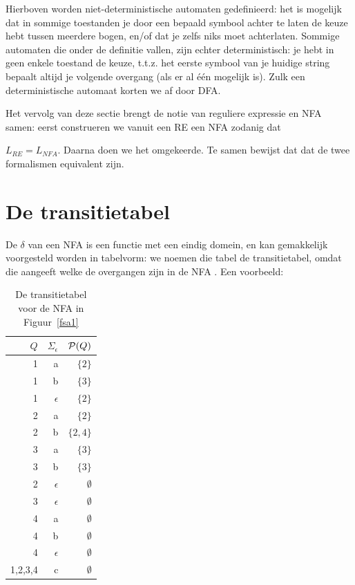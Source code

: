 Hierboven worden niet-deterministische automaten gedefinieerd: het is
mogelijk dat in sommige toestanden je door een bepaald symbool achter
te laten de keuze hebt tussen meerdere bogen, en/of dat je zelfs niks
moet achterlaten. Sommige automaten die onder de definitie vallen,
zijn echter deterministisch: je hebt in geen enkele toestand de keuze,
t.t.z. het eerste symbool van je huidige string bepaalt altijd je
volgende overgang (als er al \'{e}\'{e}n mogelijk is). Zulk een
deterministische automaat korten we af door DFA.


Het vervolg van deze sectie brengt de notie van reguliere expressie en
NFA samen: eerst construeren we vanuit een RE een NFA zodanig dat

$L_{RE} = L_{NFA}$. Daarna doen we het omgekeerde. Te samen bewijst
dat dat de twee formalismen equivalent zijn.


\section{De transitietabel}

De $\delta$ van een NFA is een functie met een eindig domein, en kan
gemakkelijk voorgesteld worden in tabelvorm: we noemen die tabel
de transitietabel, omdat die aangeeft welke de overgangen zijn in de
NFA . Een voorbeeld:

\begin{table}[ht]
\center
\begin{tabular}{|r|r|r|}
\hline
$Q$    & $\Sigma_\epsilon$ &  ${\cal P}(Q)$ \\ \hline
1      & a                  &  $\{2\}$         \\
1      & b                  &  $\{3\}$         \\
1      & $\epsilon$         &  $\{2\}$         \\
2      & a                  &  $\{2\}$         \\
2      & b                  &  $\{2,4\}$         \\
3      & a                  &  $\{3\}$         \\
3      & b                  &  $\{3\}$         \\ \hline
2      & $\epsilon$         &  $\emptyset$         \\
3      & $\epsilon$         &  $\emptyset$         \\
4      & a                  &  $\emptyset$         \\
4      & b                  &  $\emptyset$         \\
4      & $\epsilon$         &  $\emptyset$         \\
1,2,3,4 & c                 &  $\emptyset$         \\
\hline
\end{tabular}
\caption{De transitietabel voor de NFA in Figuur~\ref{fsa1}} \label{transitietabel}
\end{table}

